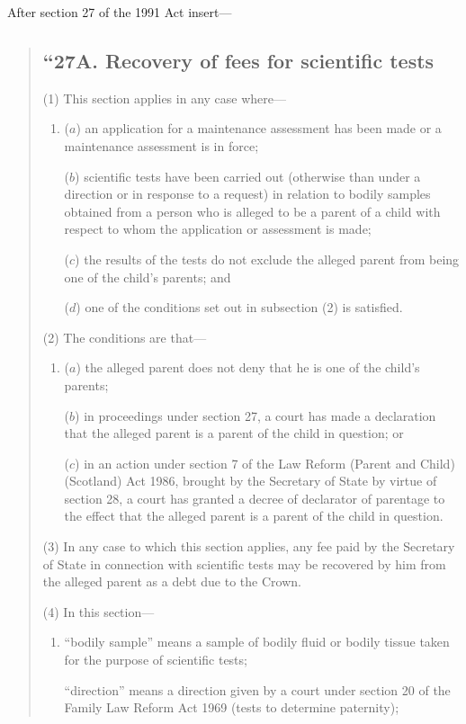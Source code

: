 \documentclass[a4paper]{article}
\begin{document}
After section 27 of the 1991 Act insert—
\begin{quotation}
\subsection*{“27A. Recovery of fees for scientific tests}

(1) This section applies in any case where—
\begin{enumerate}\item[]
($a$) an application for a maintenance assessment has been made or a maintenance assessment is in force;

($b$) scientific tests have been carried out (otherwise than under a direction or in response to a request) in relation to bodily samples obtained from a person who is alleged to be a parent of a child with respect to whom the application or assessment is made;

($c$) the results of the tests do not exclude the alleged parent from being one of the child’s parents; and

($d$) one of the conditions set out in subsection (2) is satisfied.
\end{enumerate}

(2) The conditions are that—
\begin{enumerate}\item[]
($a$) the alleged parent does not deny that he is one of the child’s parents;

($b$) in proceedings under section 27, a court has made a declaration that the alleged parent is a parent of the child in question; or

($c$) in an action under section 7 of the Law Reform (Parent and Child) (Scotland) Act 1986, brought by the Secretary of State by virtue of section 28, a court has granted a decree of declarator of parentage to the effect that the alleged parent is a parent of the child in question.
\end{enumerate}

(3) In any case to which this section applies, any fee paid by the Secretary of State in connection with scientific tests may be recovered by him from the alleged parent as a debt due to the Crown.

(4) In this section—
\begin{enumerate}\item[]
“bodily sample” means a sample of bodily fluid or bodily tissue taken for the purpose of scientific tests;

“direction” means a direction given by a court under section 20 of the Family Law Reform Act 1969 (tests to determine paternity);


\end{enumerate}
\end{quotation}
\end{document}
